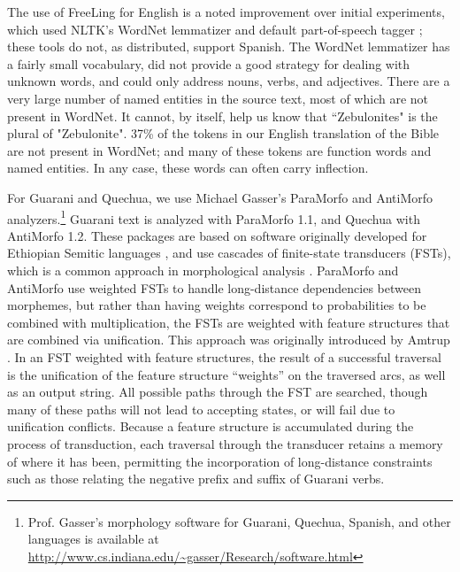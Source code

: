 The use of FreeLing for English is a noted improvement over initial
experiments, which used NLTK's WordNet lemmatizer and default part-of-speech
tagger \cite{nltkbook}; these tools do not, as distributed, support Spanish.
The WordNet lemmatizer has a fairly small vocabulary, did not
provide a good strategy for dealing with unknown words, and could only address
nouns, verbs, and adjectives.
There are a very large number of named entities in the source text, most of
which are not present in WordNet. It cannot, by itself, help us know that
``Zebulonites" is the plural of "Zebulonite".  37\% of the tokens in our
English translation of the Bible are not present in WordNet; and many of these
tokens are function words and named entities. In any case, these words can
often carry inflection.

For Guarani and Quechua, we use Michael Gasser's ParaMorfo and AntiMorfo
analyzers.\footnote{Prof. Gasser's morphology software for Guarani, Quechua,
Spanish, and other languages is available at
\url{http://www.cs.indiana.edu/~gasser/Research/software.html}} Guarani text is
analyzed with ParaMorfo 1.1, and Quechua with AntiMorfo 1.2.  These packages
are based on software originally developed for Ethiopian Semitic languages
\cite{gasser:eacl09}, and use cascades of finite-state transducers (FSTs),
which is a common approach in morphological analysis \cite{beesley+karttunen}.
ParaMorfo and AntiMorfo use weighted FSTs to handle long-distance dependencies
between morphemes, but rather than having weights correspond to probabilities
to be combined with multiplication, the FSTs are weighted with feature
structures that are combined via unification. This approach was originally
introduced by Amtrup \cite{amtrup:03}. In an FST weighted with feature
structures, the result of a successful traversal is the unification of the
feature structure ``weights'' on the traversed arcs, as well as an output
string. All possible paths through the FST are searched, though many of these
paths will not lead to accepting states, or will fail due to unification
conflicts.  Because a feature structure is accumulated during the process of
transduction, each traversal through the transducer retains a memory of where
it has been, permitting the incorporation of long-distance constraints such as
those relating the negative prefix and suffix of Guarani verbs.

